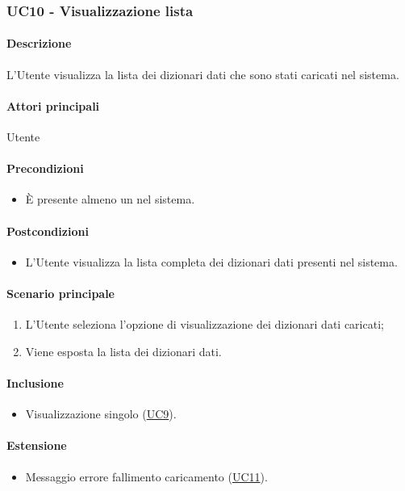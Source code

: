 \subsubsection{UC10 - Visualizzazione lista }\label{UC10}
\paragraph*{Descrizione}
L’Utente visualizza la lista dei dizionari dati che sono stati caricati nel sistema.

\paragraph*{Attori principali}
Utente

\paragraph*{Precondizioni}
\begin{itemize}
  \item È presente almeno un  nel sistema.  
\end{itemize}

\paragraph*{Postcondizioni}
\begin{itemize}
  \item L’Utente visualizza la lista completa dei dizionari dati presenti nel sistema.
\end{itemize}

\paragraph*{Scenario principale}
\begin{enumerate}
  \item L’Utente seleziona l’opzione di visualizzazione dei dizionari dati caricati;
  \item Viene esposta la lista dei dizionari dati.
\end{enumerate}

\paragraph*{Inclusione}
\begin{itemize}
  \item Visualizzazione singolo  (\hyperref[UC9]{UC9}).
\end{itemize}

\paragraph*{Estensione}
\begin{itemize}
  \item Messaggio errore fallimento caricamento  (\hyperref[UC11]{UC11}).
\end{itemize}
